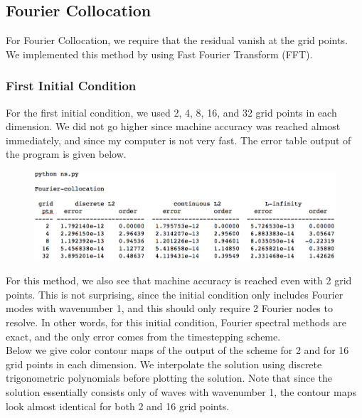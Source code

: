 \documentclass[12pt]{article}
\begin{document}
\subsection*{Fourier Collocation}
For Fourier Collocation, we require that the residual vanish at the grid points. We implemented this method by using Fast Fourier Transform (FFT).

\subsubsection*{First Initial Condition}

For the first initial condition, we used 2, 4, 8, 16, and 32 grid points in each dimension. We did not go higher since machine accuracy was reached almost immediately, and since my computer is not very fast. The error table output of the program is given below.

\begin{figure}[H]
\includegraphics[width=16cm]{images/FourierColloc.png}
\end{figure}

For this method, we also see that machine accuracy is reached even with 2 grid points. This is not surprising, since the initial condition only includes Fourier modes with wavenumber 1, and this should only require 2 Fourier nodes to resolve. In other words, for this initial condition, Fourier spectral methods are exact, and the only error comes from the timestepping scheme. \\

Below we give color contour maps of the output of the scheme for 2 and for 16 grid points in each dimension. We interpolate the solution using discrete trigonometric polynomials before plotting the solution. Note that since the solution essentially consists only of waves with wavenumber 1, the contour maps look almost identical for both 2 and 16 grid points.
\end{document}
